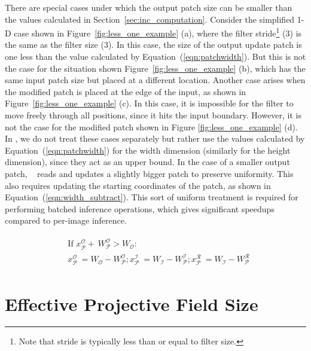 There are special cases under which the output patch size can be smaller than the values calculated in Section~\ref{sec:inc_computation}. Consider the simplified 1-D case shown in Figure~\ref{fig:less_one_example} (a), where the filter stride\footnote{Note that stride is typically less than or equal to filter size.} (3) is the same as the filter size (3). In this case, the size of the output update patch is one less than the value calculated by Equation~(\ref{eqn:patchwidth}). But this is not the case for the situation shown Figure~\ref{fig:less_one_example} (b), which has the same input patch size but placed at a different location.
Another case arises when the modified patch is placed at the edge of the input, as shown in Figure~\ref{fig:less_one_example} (c). In this case, it is impossible for the filter to move freely through all positions, since it hits the input boundary. However, it is not the case for the modified patch shown in Figure \ref{fig:less_one_example} (d). In \system, we do not treat these cases separately but rather use the values calculated by Equation~(\ref{eqn:patchwidth}) for the width dimension (similarly for the height dimension), since they act as an upper bound. In the case of a smaller output patch, \system~ reads and updates a slightly bigger patch to preserve uniformity. This also requires updating the starting coordinates of the patch, as shown in Equation~(\ref{eqn:width_subtract}). This sort of uniform treatment is required for performing batched inference operations, which gives significant speedups compared to per-image inference.

\vspace{-4mm}
\begin{align}
\begin{split}
\label{eqn:width_subtract}
&\text{If~} x^\mathcal{O}_\mathcal{P} + ~W^\mathcal{O}_\mathcal{P} > W_{\mathcal{O}}:\\
&x^\mathcal{O}_\mathcal{P} ~ =  W_{\mathcal{O}} - W^\mathcal{O}_\mathcal{P}; 
x^\mathcal{I}_\mathcal{P} ~ = W_{\mathcal{I}} - W^\mathcal{I}_\mathcal{P}; 
x^\mathcal{R}_\mathcal{P} ~ = W_{\mathcal{I}} - W^\mathcal{R}_\mathcal{P}
\end{split}
\end{align}


\section{Effective Projective Field Size}

